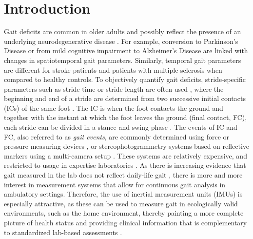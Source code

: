 \documentclass[sensors,article,submit,pdftex,moreauthors]{Definitions/mdpi}
\begin{document}
\section{Introduction}
Gait deficits are common in older adults and possibly reflect the presence of an underlying neurodegenerative disease \cite{Snijders2007,Hodgins2008}. For example, conversion to Parkinson's Disease \cite{DelDin2019} or from mild cognitive impairment to Alzheimer's Disease \cite{Koenig2017,Bertoli2018} are linked with changes in spatiotemporal gait parameters. Similarly, temporal gait parameters are different for stroke patients \cite{SchroederVon1995,Mohan2021} and patients with multiple sclerosis \cite{Griskevicius2016,Flachenecker2019} when compared to healthy controls. To objectively quantify gait deficits, stride-specific parameters such as stride time or stride length are often used \cite{Hannink2016}, where the beginning and end of a stride are determined from two successive initial contacts (ICs) of the same foot \cite{Perry2010,Whittle2012}. The IC is when the foot contacts the ground and together with the instant at which the foot leaves the ground (final contact, FC), each stride can be divided in a stance and swing phase \cite{Rueterbories2010,Bruening2014}.  The events of IC and FC, also referred to as \emph{gait events}, are commonly determined using force or pressure measuring devices \cite{Bruening2014}, or stereophotogrammetry systems based on reflective markers using a multi-camera setup \cite{Chiari2005}. These systems are relatively expensive, and restricted to usage in expertise laboratories \cite{Iosa2016,Jarchi2018}. As there is increasing evidence that gait measured in the lab does not reflect daily-life gait \cite{Hillel2019,Warmerdam2020,Atrsaei2021}, there is more and more interest in measurement systems that allow for continuous gait analysis in ambulatory settings. Therefore, the use of inertial measurement units (IMUs) is especially attractive, as these can be used to measure gait in ecologically valid environments, such as the home environment, thereby painting a more complete picture of health status \cite{DelDin2016,Shah2020} and providing clinical information that is complementary to standardized lab-based assessments \cite{Warmerdam2020,Fasano2020,Atrsaei2021,Corra2021}.
\end{document}
